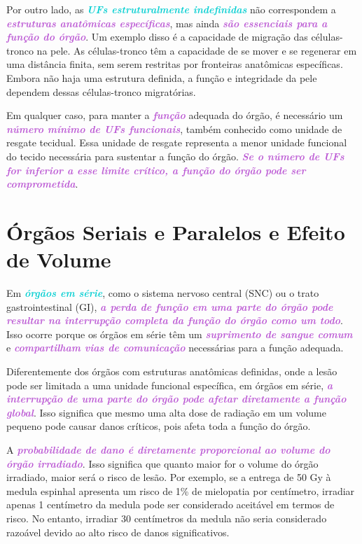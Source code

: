 \documentclass[11pt,a4paper]{article}
\newcounter{exemplo}
\begin{document}
	Por outro lado, as \textcolor{DarkTurquoise}{\textbf{\textit{UFs estruturalmente indefinidas}}} não correspondem a \textcolor{MediumOrchid}{\textbf{\textit{estruturas anatômicas específicas}}}, mas ainda \textcolor{MediumOrchid}{\textbf{\textit{são essenciais para a função do órgão}}}. Um exemplo disso é a capacidade de migração das células-tronco na pele. As células-tronco têm a capacidade de se mover e se regenerar em uma distância finita, sem serem restritas por fronteiras anatômicas específicas. Embora não haja uma estrutura definida, a função e integridade da pele dependem dessas células-tronco migratórias.

	Em qualquer caso, para manter a \textcolor{MediumOrchid}{\textbf{\textit{função}}} adequada do órgão, é necessário um \textcolor{MediumOrchid}{\textbf{\textit{número mínimo de UFs funcionais}}}, também conhecido como unidade de resgate tecidual. Essa unidade de resgate representa a menor unidade funcional do tecido necessária para sustentar a função do órgão. \textcolor{MediumOrchid}{\textbf{\textit{Se o número de UFs for inferior a esse limite crítico, a função do órgão pode ser comprometida}}}.

\section{Órgãos Seriais e Paralelos e Efeito de Volume}

	Em\textcolor{DarkTurquoise}{\textbf{\textit{ órgãos em série}}}, como o sistema nervoso central (SNC) ou o trato gastrointestinal (GI), \textcolor{MediumOrchid}{\textbf{\textit{a perda de função em uma parte do órgão pode resultar na interrupção completa da função do órgão como um todo}}}. Isso ocorre porque os órgãos em série têm um \textcolor{MediumOrchid}{\textbf{\textit{suprimento de sangue comum}}} e \textcolor{MediumOrchid}{\textbf{\textit{compartilham vias de comunicação}}} necessárias para a função adequada.

	Diferentemente dos órgãos com estruturas anatômicas definidas, onde a lesão pode ser limitada a uma unidade funcional específica, em órgãos em série, \textcolor{MediumOrchid}{\textbf{\textit{a interrupção de uma parte do órgão pode afetar diretamente a função global}}}. Isso significa que mesmo uma alta dose de radiação em um volume pequeno pode causar danos críticos, pois afeta toda a função do órgão.

	A \textcolor{MediumOrchid}{\textbf{\textit{probabilidade de dano é diretamente proporcional ao volume do órgão irradiado}}}. Isso significa que quanto maior for o volume do órgão irradiado, maior será o risco de lesão. Por exemplo, se a entrega de 50 Gy à medula espinhal apresenta um risco de 1\% de mielopatia por centímetro, irradiar apenas 1 centímetro da medula pode ser considerado aceitável em termos de risco. No entanto, irradiar 30 centímetros da medula não seria considerado razoável devido ao alto risco de danos significativos.
\end{document}
